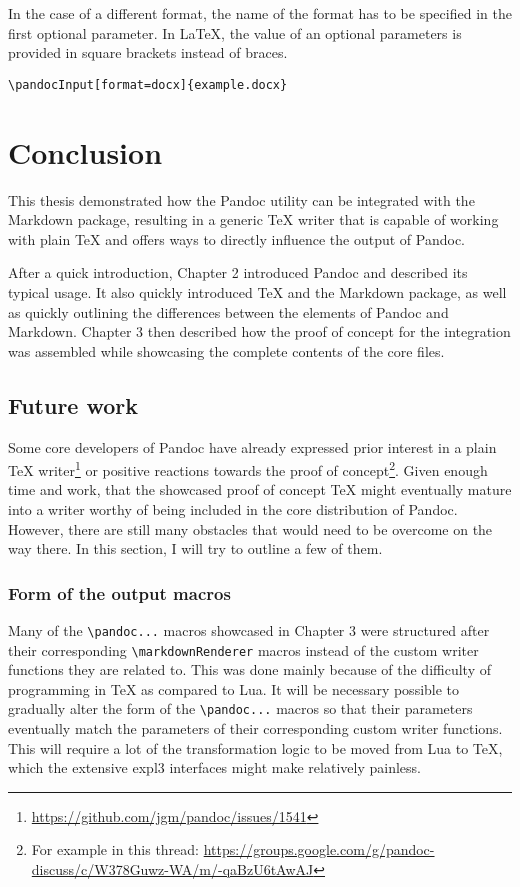 \documentclass[
  digital,     %
  oneside,     %
  nosansbold,  %
  nocolorbold, %
  lof,         %
  nolot,       %
]{fithesis4}
\newcommand\macro[1]{\texttt{\textbackslash{}{#1}}}
\newcommand\renderer[1]{\macro{markdown\-Renderer\-{#1}}}
\begin{document}
\noindent
In the case of a different format, the name of the format has to be specified in the first optional parameter. In \LaTeX{}, the value of an optional parameters is provided in square brackets instead of braces.

\noindent
\lstset{language=[LaTeX]TeX}
\begin{lstlisting}
\pandocInput[format=docx]{example.docx}
\end{lstlisting}

\chapter{Conclusion}
This thesis demonstrated how the Pandoc utility can be integrated with the Markdown package, resulting in a generic \TeX{} writer that is capable of working with plain \TeX{} and offers ways to directly influence the output of Pandoc.

After a quick introduction, Chapter 2 introduced Pandoc and described its typical usage. It also quickly introduced \TeX{} and the Markdown package, as well as quickly outlining the differences between the elements of Pandoc and Markdown. Chapter 3 then described how the proof of concept for the integration was assembled while showcasing the complete contents of the core files.

\section{Future work}
Some core developers of Pandoc have already expressed prior interest in a plain \TeX{} writer\footnote{\url{https://github.com/jgm/pandoc/issues/1541}} or positive reactions towards the proof of concept\footnote{For example in this thread: \url{https://groups.google.com/g/pandoc-discuss/c/W378Guwz-WA/m/-qaBzU6tAwAJ}}. Given enough time and work, that the showcased proof of concept \TeX{} might eventually mature into a writer worthy of being included in the core distribution of Pandoc. However, there are still many obstacles that would need to be overcome on the way there. In this section, I will try to outline a few of them.

\subsection{Form of the output macros}
Many of the \macro{pandoc...} macros showcased in Chapter 3 were structured after their corresponding \renderer{...} macros instead of the custom writer functions they are related to. This was done mainly because of the difficulty of programming in \TeX{} as compared to Lua. It will be necessary possible to gradually alter the form of the \macro{pandoc...} macros so that their parameters eventually match the parameters of their corresponding custom writer functions. This will require a lot of the transformation logic to be moved from Lua to \TeX{}, which the extensive expl3 interfaces \cite{l3-interfaces} might make relatively painless.
\end{document}
